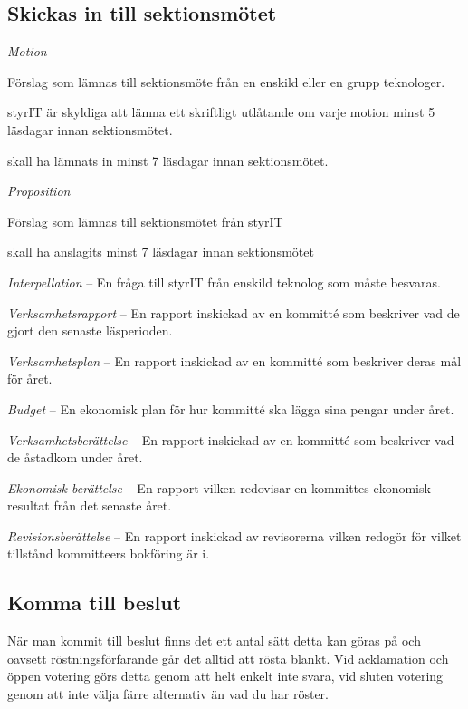 \documentclass[11pt, noincludeaddress]{classes/cthit}
\let\tempone\itemize
\let\temptwo\enditemize
\renewenvironment{itemize}{\tempone\addtolength{\itemsep}{-0.3\baselineskip}}{\temptwo}
\begin{document}
\subsection{Skickas in till sektionsmötet}
\begin{itemize}
    \item \textit{Motion}
    \begin{itemize}
        \item Förslag som lämnas till sektionsmöte från en enskild eller en grupp teknologer.
        \item styrIT är skyldiga att lämna ett skriftligt utlåtande om varje motion minst 5 läsdagar innan sektionsmötet.
        \item skall ha lämnats in minst 7 läsdagar innan sektionsmötet.
    \end{itemize}
    \item \textit{Proposition}
    \begin{itemize}
        \item Förslag som lämnas till sektionsmötet från styrIT
        \item skall ha anslagits minst 7 läsdagar innan sektionsmötet
    \end{itemize}

    \item \textit{Interpellation} -- En fråga till styrIT från enskild teknolog som måste besvaras.
    \item \textit{Verksamhetsrapport} -- En rapport inskickad av en kommitté som beskriver vad de gjort den senaste läsperioden.
    \item \textit{Verksamhetsplan} -- En rapport inskickad av en kommitté som beskriver deras mål för året.
    \item \textit{Budget} -- En ekonomisk plan för hur kommitté ska lägga sina pengar under året.
    \item \textit{Verksamhetsberättelse} -- En rapport inskickad av en kommitté som beskriver vad de åstadkom under året.
    \item \textit{Ekonomisk berättelse} -- En rapport vilken redovisar en kommittes ekonomisk resultat från det senaste året.
    \item \textit{Revisionsberättelse} -- En rapport inskickad av revisorerna vilken redogör för vilket tillstånd kommitteers bokföring är i.
    
\end{itemize}

\subsection{Komma till beslut}
När man kommit till beslut finns det ett antal sätt detta kan göras på och oavsett röstningsförfarande går det alltid att rösta blankt. Vid acklamation och öppen votering görs detta genom att helt enkelt inte svara, vid sluten votering genom att inte välja färre alternativ än vad du har röster.
\end{document}
